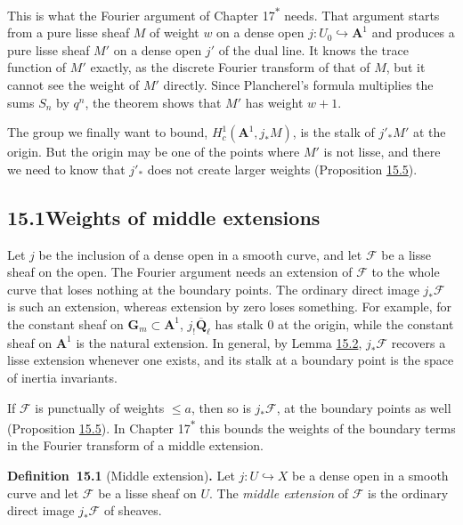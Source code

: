 \documentclass[11pt]{article}
\newenvironment{bpstatement}[2]{\par\addvspace{0.6\baselineskip}\noindent\textbf{#1}#2\textbf{.}\enspace\ignorespaces}
  {\par\addvspace{0.4\baselineskip}}
\newcommand{\bpout}[1]{#1\textsuperscript{\hyperlink{bp-outside}{\ensuremath{\ast}}}}
\begin{document}
This is what the Fourier argument of Chapter \bpout{17} needs. That argument starts from a pure lisse sheaf \(M\) of weight \(w\) on a dense open \(j:U_0\hookrightarrow\mathbf A^1\) and produces a pure lisse sheaf \(M'\) on a dense open \(j'\) of the dual line. It knows the trace function of \(M'\) exactly, as the discrete Fourier transform of that of \(M\), but it cannot see the weight of \(M'\) directly. Since Plancherel's formula multiplies the sums \(S_n\) by \(q^n\), the theorem shows that \(M'\) has weight \(w+1\).

The group we finally want to bound, \(H^1_c(\mathbf A^1,j_*M)\), is the stalk of \(j'_*M'\) at the origin. But the origin may be one of the points where \(M'\) is not lisse, and there we need to know that \(j'_*\) does not create larger weights (Proposition \hyperref[bp13]{15.5}).

\subsection*{\texorpdfstring{15.1\quad Weights of middle extensions}{15.1 Weights of middle extensions}}
\label{bp3}%
\label{bp4}%
Let \(j\) be the inclusion of a dense open in a smooth curve, and let \(\mathcal F\) be a lisse sheaf on the open. The Fourier argument needs an extension of \(\mathcal F\) to the whole curve that loses nothing at the boundary points. The ordinary direct image \(j_*\mathcal F\) is such an extension, whereas extension by zero loses something. For example, for the constant sheaf on \(\mathbf G_m\subset\mathbf A^1\), \(j_!\overline{\mathbf Q}_\ell\) has stalk \(0\) at the origin, while the constant sheaf on \(\mathbf A^1\) is the natural extension. In general, by Lemma \hyperref[bp6]{15.2}, \(j_*\mathcal F\) recovers a lisse extension whenever one exists, and its stalk at a boundary point is the space of inertia invariants.

If \(\mathcal F\) is punctually of weights \(\le a\), then so is \(j_*\mathcal F\), at the boundary points as well (Proposition \hyperref[bp13]{15.5}). In Chapter \bpout{17} this bounds the weights of the boundary terms in the Fourier transform of a middle extension.

\label{bp5}%
\begin{bpstatement}{Definition~15.1}{ (Middle extension)}
Let \(j:U\hookrightarrow X\) be a dense open in a smooth curve and let \(\mathcal F\) be a lisse sheaf on \(U\). The \emph{middle extension} of \(\mathcal F\) is the ordinary direct image \(j_*\mathcal F\) of sheaves.
\end{bpstatement}
\end{document}
